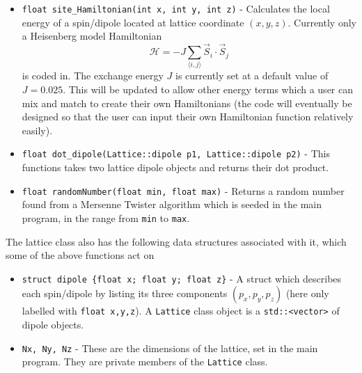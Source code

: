 \documentclass[aps,prb,twocolumn,showpacs,superscriptaddress,floatfix]{revtex4-1}
\begin{document}
\begin{itemize}
\item {\tt float site\_Hamiltonian(int x, int y, int z)} - Calculates the local energy of a spin/dipole located at lattice coordinate $(x,y,z)$. Currently only a Heisenberg model Hamiltonian
\begin{equation}
\mathcal{H} = -J\sum_{\langle i,j\rangle} \vec{S}_i \cdot \vec{S}_j
\end{equation}
is coded in. The exchange energy $J$ is currently set at a default value of $J=0.025$. This will be updated to allow other energy terms which a user can mix and match to create their own Hamiltonians (the code will eventually be designed so that the user can input their own Hamiltonian function relatively easily).
\item {\tt float dot\_dipole(Lattice::dipole p1, Lattice::dipole p2)} - This functions takes two lattice dipole objects and returns their dot product.
\item {\tt float randomNumber(float min, float max)} - Returns a random number found from a Mersenne Twister algorithm which is seeded in the main program, in the range from {\tt min} to {\tt max}.
\end{itemize}

The lattice class also has the following data structures associated with it, which some of the above functions act on
\begin{itemize}
\item {\tt struct dipole \{float x; float y; float z\}} - A struct which describes each spin/dipole by listing its three components $(p_x,p_y,p_z)$ (here only labelled with {\tt float x,y,z}). A {\tt Lattice} class object is a {\tt  std::<vector>} of dipole objects.
\item {\tt Nx, Ny, Nz} - These are the dimensions of the lattice, set in the main program. They are private members of the {\tt Lattice} class.
\end{itemize}
\end{document}
